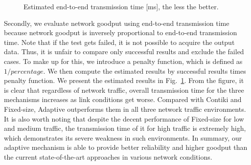 \documentclass[runningheads,a4paper]{llncs}
\begin{document}
\begin{figure}
	\vspace{-15pt}
	\centering
	\caption{Estimated end-to-end transmission time [ms], the less the better.}
	\label{fig:tm}
	\vspace{-15pt}
\end{figure}

Secondly, we evaluate network goodput using end-to-end transmission time because network goodput is inversely proportional to end-to-end transmission time. Note that if the test gets failed, it is not possible to acquire the output data. Thus, it is unfair to compare only successful results and exclude the failed cases. To make up for this, we introduce a penalty function, which is defined as $1/percentage$. We then compute the estimated results by successful results times penalty function. We present the estimated results in Fig.~\ref{fig:tm}. From the figure, it is clear that regardless of network traffic, overall transmission time for the three mechanisms increases as link conditions get worse. Compared with Contiki and Fixed-size, Adaptive outperforms them in all three network traffic environments. It is also worth noting that despite the decent performance of Fixed-size for low and medium traffic, the transmission time of it for high traffic is extremely high, which demonstrates its severe weakness in such environments. In summary, our adaptive mechanism is able to provide better reliability and higher goodput than the current state-of-the-art approaches in various network conditions.
\end{document}
